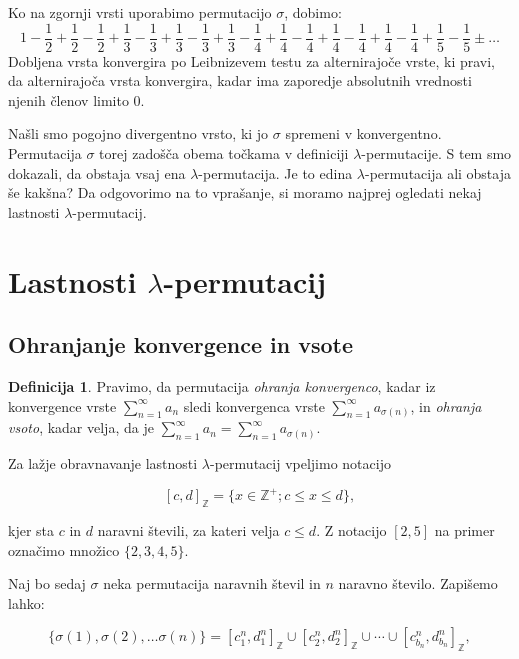 \documentclass[12pt,a4paper,reqno]{amsart}
\theoremstyle{definition} %
\newtheorem{definicija}{Definicija}[section]
\theoremstyle{plain} %
\newcommand{\Z}{\mathbb Z}
\begin{document}
Ko na zgornji vrsti uporabimo permutacijo $\sigma$, dobimo:
$$1-\frac{1}{2}+\frac{1}{2}-\frac{1}{2}+\frac{1}{3}-\frac{1}{3}+\frac{1}{3}-\frac{1}{3}+\frac{1}{3}-\frac{1}{4}+\frac{1}{4}-\frac{1}{4}+\frac{1}{4}-\frac{1}{4}+\frac{1}{4}-\frac{1}{4}+\frac{1}{5}-\frac{1}{5} \pm \dots$$
Dobljena vrsta konvergira po Leibnizevem testu za alternirajoče vrste, ki pravi, da alternirajoča vrsta konvergira, kadar ima zaporedje absolutnih vrednosti njenih členov limito 0. %

Našli smo pogojno divergentno vrsto, ki jo $\sigma$ spremeni v konvergentno. Permutacija $\sigma$ torej zadošča obema točkama v definiciji $\lambda$-permutacije. S tem smo dokazali, da obstaja vsaj ena $\lambda$-permutacija. Je to edina $\lambda$-permutacija ali obstaja še kakšna? Da odgovorimo na to vprašanje, si moramo najprej ogledati nekaj lastnosti $\lambda$-permutacij.

\section{Lastnosti $\lambda$-permutacij}
\subsection{Ohranjanje konvergence in vsote}

\begin{definicija}
Pravimo, da permutacija \emph{ohranja konvergenco}, kadar iz konvergence vrste $\sum^{\infty}_{n=1}a_n$ sledi konvergenca vrste $\sum^{\infty}_{n=1}a_{\sigma (n)}$, in \emph{ohranja vsoto}, kadar velja, da je $\sum^{\infty}_{n=1}a_n=\sum^{\infty}_{n=1}a_{\sigma (n)}$.
\end{definicija}

Za lažje obravnavanje lastnosti $\lambda$-permutacij vpeljimo notacijo %

$$[c,d]_{\Z}=\{x \in \Z^+ ; c \leq x \leq d \},$$

kjer sta $c$ in $d$ naravni števili, za kateri velja $c\leq d$. Z notacijo $[2,5]$ na primer označimo množico $\{2,3,4,5\}$.

Naj bo sedaj $\sigma$ neka permutacija naravnih števil in $n$ naravno število. Zapišemo lahko:

\begin{equation} \label{eq:4}
\{ \sigma (1), \sigma (2), \ldots \sigma (n) \} = [c^n_1, d^n_1]_{\Z} \cup [c^n_2, d^n_2]_{\Z} \cup \cdots \cup [c^n_{b_n}, d^n_{b_n}]_{\Z},
\end{equation} 
\end{document}
